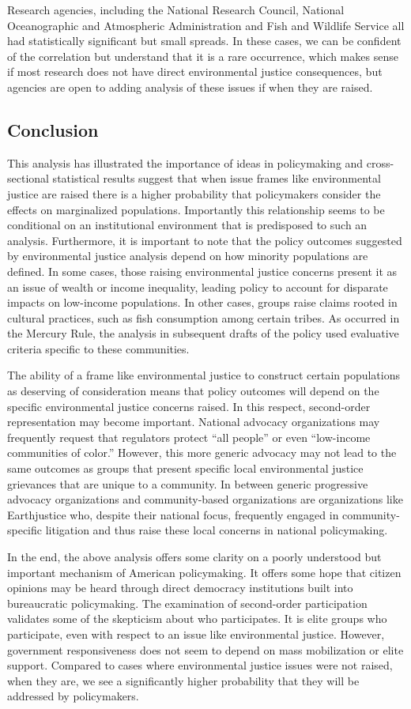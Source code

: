 Research agencies, including the National Research Council, National Oceanographic and Atmospheric Administration and Fish and Wildlife Service all had statistically significant but small spreads. In these cases, we can be confident of the correlation but understand that it is a rare occurrence, which makes sense if most research does not have direct environmental justice consequences, but agencies are open to adding analysis of these issues if when they are raised. 

\subsection{Conclusion}
This analysis has illustrated the importance of ideas in policymaking and cross-sectional statistical results suggest that when issue frames like environmental justice are raised there is a higher probability that policymakers consider the effects on marginalized populations. Importantly this relationship seems to be conditional on an institutional environment that is predisposed to such an analysis. Furthermore, it is important to note that the policy outcomes suggested by environmental justice analysis depend on how minority populations are defined. In some cases, those raising environmental justice concerns present it as an issue of wealth or income inequality, leading policy to account for disparate impacts on low-income populations. In other cases, groups raise claims rooted in cultural practices, such as fish consumption among certain tribes. As occurred in the Mercury Rule, the analysis in subsequent drafts of the policy used evaluative criteria specific to these communities. 

The ability of a frame like environmental justice to construct certain populations as deserving of consideration means that policy outcomes will depend on the specific environmental justice concerns raised. In this respect, second-order representation may become important. National  advocacy organizations may frequently request that regulators protect ``all people'' or even ``low-income communities of color.'' However, this more generic advocacy may not lead to the same outcomes as groups that present specific local environmental justice grievances that are unique to a community. In between generic progressive advocacy organizations and community-based organizations are organizations like Earthjustice who, despite their national focus, frequently engaged in community-specific litigation and thus raise these local concerns in national policymaking. 

In the end, the above analysis offers some clarity on a poorly understood but important mechanism of American policymaking. It offers some hope that citizen opinions may be heard through direct democracy institutions built into bureaucratic policymaking.  The examination of second-order participation validates some of the skepticism about who participates. It is elite groups who participate, even with respect to an issue like environmental justice. However, government responsiveness does not seem to depend on mass mobilization or elite support. Compared to cases where environmental justice issues were not raised, when they are, we see a significantly higher probability that they will be addressed by policymakers. 